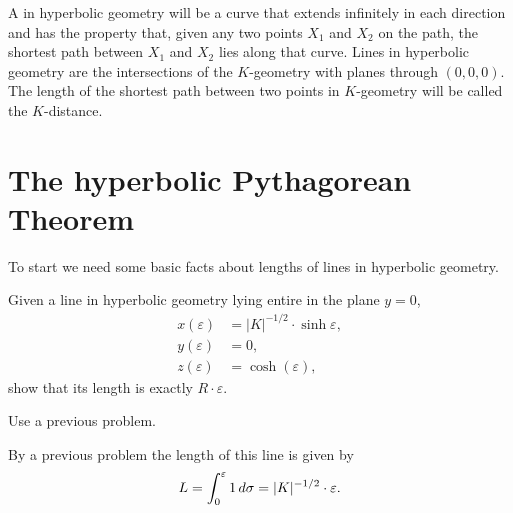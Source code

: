 \documentclass{ximera}
\begin{document}
\begin{definition}
A  in hyperbolic geometry will be a curve that extends
infinitely in each direction and has the property that, given any two
points $X_{1}$ and $X_{2}$ on the path, the shortest path between
$X_{1}$ and $X_{2}$ lies along that curve. Lines in hyperbolic
geometry are the intersections of the $K$-geometry with planes through
$(0,0,0)$. The length of the shortest path between two points in
$K$-geometry will be called the $K$-distance.
\end{definition}


\section{The hyperbolic Pythagorean Theorem}

To start we need some basic facts about lengths of lines in hyperbolic
geometry.

\begin{problem}
  Given a line in hyperbolic geometry lying entire in the plane
  $y=0$,
  \begin{align*}
    x(\varepsilon) &= |K|^{-1/2}\cdot\sinh\varepsilon,\\
    y(\varepsilon) &= 0,\\
    z(\varepsilon) &= \cosh(\varepsilon),
  \end{align*}
  show that its length is exactly $R\cdot \varepsilon$.
  \begin{hint}
    Use a previous problem.
  \end{hint}
  \begin{freeResponse}
    By a previous problem the length of this line is given by
    \[
    L=\int_{0}^{\varepsilon} 1 \,d\sigma = |K|^{-1/2}\cdot\varepsilon.
    \]
  \end{freeResponse}
\end{problem}
\end{document}
